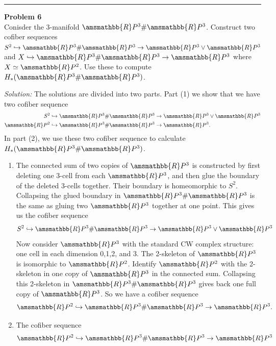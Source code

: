 \documentclass[a4paper, 12pt]{article}
\newenvironment{problem}[2][Problem]
    { \begin{mdframed}[backgroundcolor=gray!20] \textbf{#1 #2} \\}
    {  \end{mdframed}}
\newenvironment{solution}
    {\textit{Solution:}}
    {}
\renewcommand{\mathbb}{\amsmathbb}
\begin{document}
\noindent\rule{7in}{2.8pt}
\begin{problem}{6}
Conisder the \(3\)-manifold \(\mathbb{R}P^3\#\mathbb{R}P^3\). Construct two cofiber sequences \(S^2\hookrightarrow \mathbb{R}P^3\#\mathbb{R}P^3\rightarrow \mathbb{R}P^3\vee \mathbb{R}P^3\) and 
\(X\hookrightarrow \mathbb{R}P^3\#\mathbb{R}P^3\rightarrow \mathbb{R}P^3\) where \(X\simeq \mathbb{R}P^2\). Use these to compute \(H_*(\mathbb{R}P^3\#\mathbb{R}P^3)\).
\end{problem}
\begin{solution}
The solutions are divided into two parts. Part (1) we show that we have two cofiber sequence 
\begin{align*}
	S^2&\hookrightarrow \mathbb{R}P^3\#\mathbb{R}P^3\rightarrow \mathbb{R}P^3\vee \mathbb{R}P^3\\ 
	\mathbb{R}P^2&\hookrightarrow \mathbb{R}P^3\# \mathbb{R}P^3\rightarrow \mathbb{R}P^3.
\end{align*}
In part (2), we use these two cofiber sequence to calculate \(H_*(\mathbb{R}P^3\# \mathbb{R}P^3)\).
\begin{enumerate}[(1)]
\item The connected sum of two copies of \(\mathbb{R}P^3\) is constructed by first deleting one 3-cell from each \(\mathbb{R}P^3\), and then glue the boundary of the deleted 3-cells together. Their boundary 
is homeomorphic to \(S^2\). Collapsing the glued boundary in \(\mathbb{R}P^3\# \mathbb{R}P^3\) is the same as gluing two \(\mathbb{R}P^3\) together at one point. This gives us the cofiber sequence 
\[S^2\hookrightarrow \mathbb{R}P^3\#\mathbb{R}P^3\rightarrow \mathbb{R}P^3\vee \mathbb{R}P^3\]
Now consider \(\mathbb{R}P^3\) with the standard CW complex structure: one cell in each dimension 0,1,2, and 3. The 2-skeleton of \(\mathbb{R}P^3\) is isomorphic to \(\mathbb{R}P^2\). Identify \(\mathbb{R}P^2\) with the 2-skeleton 
in one copy of \(\mathbb{R}P^3\) in the connected sum. Collapsing this 2-skeleton in \(\mathbb{R}P^3\# \mathbb{R}P^3\) gives back one full copy of \(\mathbb{R}P^3\). So we have a cofiber sequence 
\[\mathbb{R}P^2\hookrightarrow \mathbb{R}P^3\# \mathbb{R}P^3\rightarrow \mathbb{R}P^3.\]
\item The cofiber sequence 
\[\mathbb{R}P^2\hookrightarrow \mathbb{R}P^3\# \mathbb{R}P^3\rightarrow \mathbb{R}P^3\]

\end{enumerate}
\end{solution}
\end{document}
